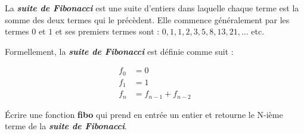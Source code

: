 \documentclass[11pt]{exam}
\begin{document}
\begin{questions}
\newpage
\question La \textit{\bf suite de Fibonacci} est une suite d'entiers dans laquelle chaque terme est la somme des deux termes qui le pr\'ec\`edent. Elle commence g\'en\'eralement par les termes $0$ et $1$ et ses premiers termes sont : $0, 1, 1, 2, 3, 5, 8, 13, 21,\dots$ etc.

Formellement, la \textit{\bf suite de Fibonacci} est d\'efinie comme suit :

\begin{align*}
f_0 &= 0\\
f_1 &= 1\\
f_n &= f_{n-1} + f_{n-2}
\end{align*}

\'Ecrire une fonction \textcolor{ballblue}{\bf fibo} qui prend en entr\'ee un entier et retourne le N-i\`eme terme de la \textit{\bf suite de Fibonacci}.







\end{questions}
\end{document}
